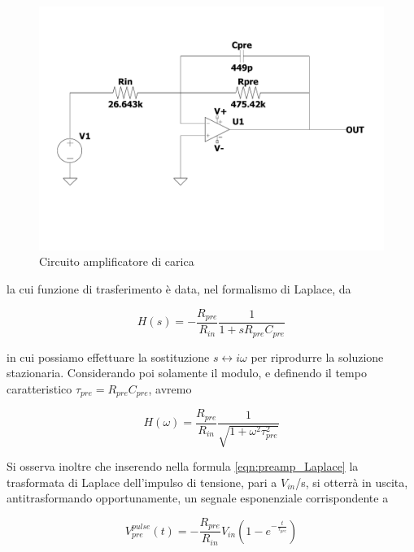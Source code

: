 \documentclass{article}
\begin{document}
\begin{center}
\begin{figure}[H]
\centering
\includegraphics[scale=0.1875, angle=0]{preamp.pdf}
\caption{ Circuito amplificatore di carica }
\label{fig:preamp}
\end{figure}
\end{center}

la cui funzione di trasferimento è data, nel formalismo di Laplace, da

\begin{equation}
    \label{eqn:preamp_Laplace}
    H(s) = -\frac{R_{pre}}{R_{in}} \frac{1}{1+sR_{pre}C_{pre}}
\end{equation}

in cui possiamo effettuare la sostituzione $s \longleftrightarrow i\omega$ per riprodurre la soluzione stazionaria. Considerando poi
solamente il modulo, e definendo il tempo caratteristico $\tau_{pre}=R_{pre}C_{pre}$, avremo

\begin{equation}
    \label{eqn:preamp_trasf}
    H(\omega) = \frac{R_{pre}}{R_{in}} \frac{1}{\sqrt{1+\omega^2\tau_{pre}^2}}
\end{equation}

Si osserva inoltre che inserendo nella formula \ref{eqn:preamp_Laplace} la trasformata di Laplace dell'impulso di tensione, pari a 
$V_{in}$/s, si otterrà in uscita, antitrasformando opportunamente, un segnale esponenziale corrispondente a

\begin{equation}
    \label{eqn:Vout1_preamp}
    V_{pre}^{pulse}(t) = -\frac{R_{pre}}{R_{in}}V_{in}(1-e^{-\frac{t}{\tau_{pre}}})
\end{equation}
\end{document}

